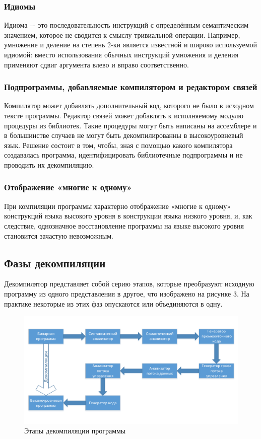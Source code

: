 \subsubsection*{Идиомы}
Идиома –- это последовательность инструкций с определённым семантическим значением, которое не сводится к смыслу тривиальной операции. Например, умножение и деление на степень 2-ки является известной и широко используемой идиомой: вместо использования обычных инструкций умножения и деления применяют сдвиг аргумента влево и вправо соответственно.

\subsubsection*{Подпрограммы, добавляемые компилятором и редактором связей}
Компилятор может добавлять дополнительный код, которого не было в исходном тексте программы. Редактор связей может добавлять к исполняемому модулю процедуры из библиотек. Такие процедуры могут быть написаны на ассемблере и в большинстве случаев не могут быть декомпилированны в высокоуровневый язык. Решение состоит в том, чтобы, зная с помощью какого компилятора создавалась программа, идентифицировать библиотечные подпрограммы и не проводить их декомпиляцию.
\subsubsection*{Отображение «многие к одному»}
При компиляции программы характерно отображение «многие к одному» конструкций языка высокого уровня в конструкции языка низкого уровня, и, как следствие, однозначное восстановление программы на языке высокого уровня становится зачастую невозможным.

\subsection{Фазы декомпиляции}

Декомпилятор представляет собой серию этапов, которые преобразуют исходную программу из одного представления в другое, что изображено на рисунке 3. На практике некоторые из этих фаз опускаются или объединяются в одну\cite{sheglov}.

\begin{figure}[H]
\includegraphics[width=1\linewidth]{Zabransky/work.pdf}   
\caption{Этапы декомпиляции программы}
\end{figure}

